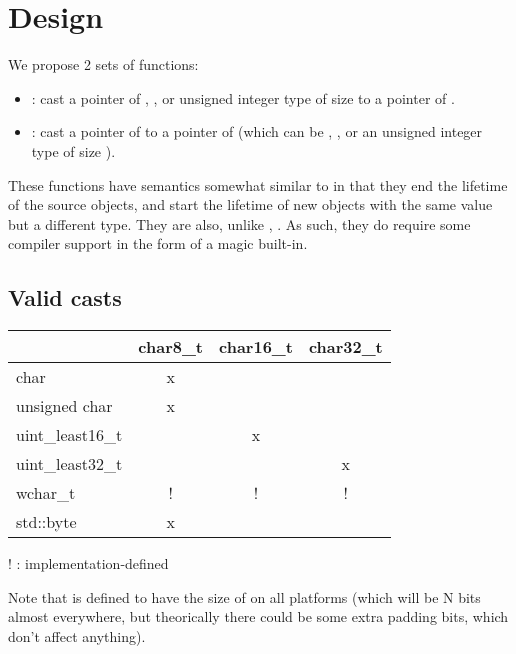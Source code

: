\documentclass{wg21}
\begin{document}
\section{Design}

We propose 2 sets of functions:

\begin{itemize}
\item {}: cast a pointer of , ,  or unsigned integer type of size  to a pointer of .
\item {}: cast a pointer of  to a pointer of  (which can be , ,  or an unsigned integer type of size ).
\end{itemize}

These functions have semantics somewhat similar to  in that they end the lifetime of the source objects, and start the lifetime of new objects with the same value but a different type. They are also, unlike , .
As such, they do require some compiler support in the form of a magic built-in.

\subsection {Valid casts}

\begin{tabular}{|l|c|c|c|}
    \hline
    & char8\_t & char16\_t & char32\_t \\
    \hline
    char & x &  &  \\
    \hline
    unsigned char & x &  &  \\
    \hline
    uint\_least16\_t &  & x &  \\
    \hline
    uint\_least32\_t &  &  & x \\
    \hline
    wchar\_t & ! & ! & ! \\
    \hline
    std::byte & x &  &  \\
    \hline
\end{tabular}

! : implementation-defined

Note that  is defined to have the size of  on all platforms
(which will be N bits almost everywhere, but theorically there could be some extra padding bits, which don't affect anything).
\end{document}
